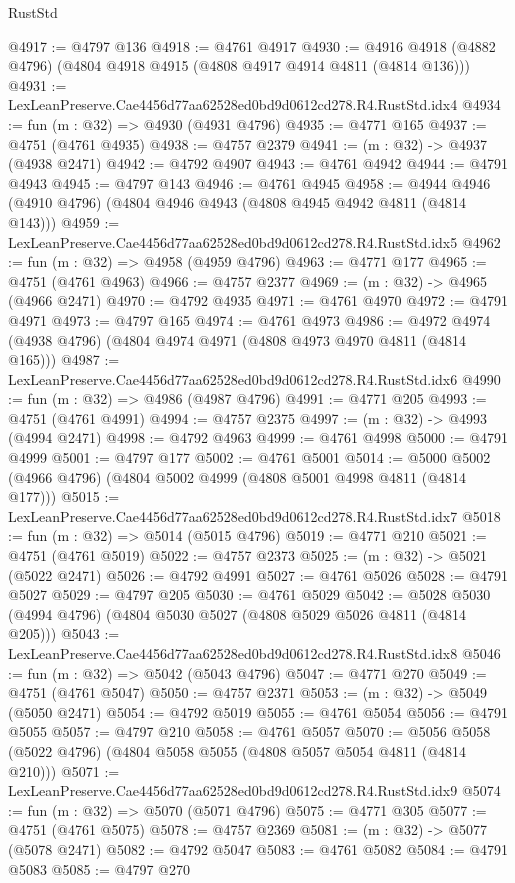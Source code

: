 \begin{lexlean}{RustStd}
\begin{coremodule}
@4917 := @4797 @136
@4918 := @4761 @4917
@4930 := @4916 @4918 (@4882 @4796) (@4804 @4918 @4915 (@4808 @4917 @4914 @4811 (@4814 @136)))
@4931 := LexLeanPreserve.Cae4456d77aa62528ed0bd9d0612cd278.R4.RustStd.idx4
@4934 := fun (m : @32) => @4930 (@4931 @4796)
@4935 := @4771 @165
@4937 := @4751 (@4761 @4935)
@4938 := @4757 @2379
@4941 := (m : @32) -> @4937 (@4938 @2471)
@4942 := @4792 @4907
@4943 := @4761 @4942
@4944 := @4791 @4943
@4945 := @4797 @143
@4946 := @4761 @4945
@4958 := @4944 @4946 (@4910 @4796) (@4804 @4946 @4943 (@4808 @4945 @4942 @4811 (@4814 @143)))
@4959 := LexLeanPreserve.Cae4456d77aa62528ed0bd9d0612cd278.R4.RustStd.idx5
@4962 := fun (m : @32) => @4958 (@4959 @4796)
@4963 := @4771 @177
@4965 := @4751 (@4761 @4963)
@4966 := @4757 @2377
@4969 := (m : @32) -> @4965 (@4966 @2471)
@4970 := @4792 @4935
@4971 := @4761 @4970
@4972 := @4791 @4971
@4973 := @4797 @165
@4974 := @4761 @4973
@4986 := @4972 @4974 (@4938 @4796) (@4804 @4974 @4971 (@4808 @4973 @4970 @4811 (@4814 @165)))
@4987 := LexLeanPreserve.Cae4456d77aa62528ed0bd9d0612cd278.R4.RustStd.idx6
@4990 := fun (m : @32) => @4986 (@4987 @4796)
@4991 := @4771 @205
@4993 := @4751 (@4761 @4991)
@4994 := @4757 @2375
@4997 := (m : @32) -> @4993 (@4994 @2471)
@4998 := @4792 @4963
@4999 := @4761 @4998
@5000 := @4791 @4999
@5001 := @4797 @177
@5002 := @4761 @5001
@5014 := @5000 @5002 (@4966 @4796) (@4804 @5002 @4999 (@4808 @5001 @4998 @4811 (@4814 @177)))
@5015 := LexLeanPreserve.Cae4456d77aa62528ed0bd9d0612cd278.R4.RustStd.idx7
@5018 := fun (m : @32) => @5014 (@5015 @4796)
@5019 := @4771 @210
@5021 := @4751 (@4761 @5019)
@5022 := @4757 @2373
@5025 := (m : @32) -> @5021 (@5022 @2471)
@5026 := @4792 @4991
@5027 := @4761 @5026
@5028 := @4791 @5027
@5029 := @4797 @205
@5030 := @4761 @5029
@5042 := @5028 @5030 (@4994 @4796) (@4804 @5030 @5027 (@4808 @5029 @5026 @4811 (@4814 @205)))
@5043 := LexLeanPreserve.Cae4456d77aa62528ed0bd9d0612cd278.R4.RustStd.idx8
@5046 := fun (m : @32) => @5042 (@5043 @4796)
@5047 := @4771 @270
@5049 := @4751 (@4761 @5047)
@5050 := @4757 @2371
@5053 := (m : @32) -> @5049 (@5050 @2471)
@5054 := @4792 @5019
@5055 := @4761 @5054
@5056 := @4791 @5055
@5057 := @4797 @210
@5058 := @4761 @5057
@5070 := @5056 @5058 (@5022 @4796) (@4804 @5058 @5055 (@4808 @5057 @5054 @4811 (@4814 @210)))
@5071 := LexLeanPreserve.Cae4456d77aa62528ed0bd9d0612cd278.R4.RustStd.idx9
@5074 := fun (m : @32) => @5070 (@5071 @4796)
@5075 := @4771 @305
@5077 := @4751 (@4761 @5075)
@5078 := @4757 @2369
@5081 := (m : @32) -> @5077 (@5078 @2471)
@5082 := @4792 @5047
@5083 := @4761 @5082
@5084 := @4791 @5083
@5085 := @4797 @270

\end{coremodule}
\end{lexlean}
